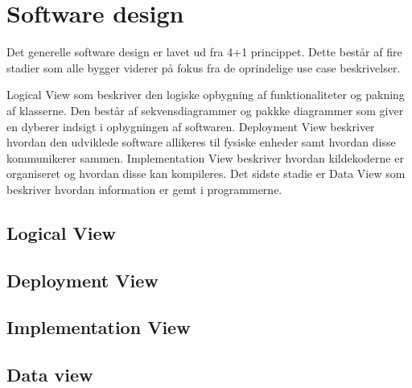 \chapter{Software design}
Det generelle software design er lavet ud fra 4+1 princippet. Dette består af fire stadier som alle bygger viderer på fokus fra de oprindelige use case beskrivelser.

Logical View som beskriver den logiske opbygning af funktionaliteter og pakning af klasserne. Den består af sekvensdiagrammer og pakkke diagrammer som giver en dyberer indsigt i opbygningen af softwaren.\newline
Deployment View beskriver hvordan den udviklede software allikeres til fysiske enheder samt hvordan disse kommunikerer sammen.\newline
Implementation View beskriver hvordan kildekoderne er organiseret og hvordan disse kan kompileres.\newline
Det sidste stadie er Data View som beskriver hvordan information er gemt i programmerne.

\section{Logical View}


\section{Deployment View}


\section{Implementation View}


\section{Data view}

